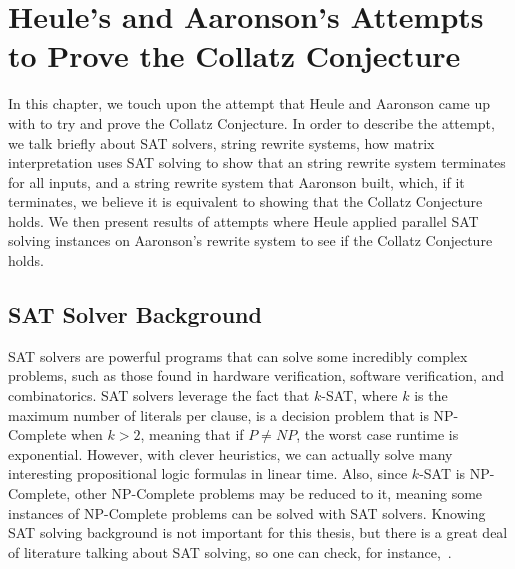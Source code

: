 \chapter{Heule's and Aaronson's Attempts to Prove the Collatz Conjecture} \label{sec:SRSandSAT}
In this chapter, we touch upon the attempt that Heule and Aaronson came up with to try and prove the Collatz Conjecture. In order to describe the attempt, we talk briefly about SAT solvers, string rewrite systems, how matrix interpretation uses SAT solving to show that an string rewrite system terminates for all inputs, and a string rewrite system that Aaronson built, which, if it terminates, we believe it is equivalent to showing that the Collatz Conjecture holds. We then present results of attempts where Heule applied parallel SAT solving instances on Aaronson's rewrite system to see if the Collatz Conjecture holds.
\section{SAT Solver Background}
SAT solvers are powerful programs that can solve some incredibly complex problems, such as those found in hardware verification, software verification, and combinatorics. SAT solvers leverage the fact that $k$-SAT, where $k$ is the maximum number of literals per clause, is a decision problem that is NP-Complete when $k > 2$, meaning that if $P \ne NP$, the worst case runtime is exponential. However, with clever heuristics, we can actually solve many interesting propositional logic formulas in linear time. Also, since $k$-SAT is NP-Complete, other NP-Complete problems may be reduced to it, meaning some instances of NP-Complete problems can be solved with SAT solvers. Knowing SAT solving background is not important for this thesis, but there is a great deal of literature talking about SAT solving, so one can check, for instance,~\cite{Biere:2009:HSV:1550723}.
